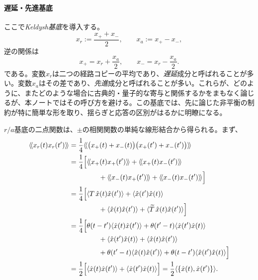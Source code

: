 \documentclass[a4paper,11pt,oneside]{article}
\theoremstyle{definition}
\numberwithin{equation}{section}
\begin{document}
\paragraph{遅延・先進基底} ここで\textit{Keldysh基底}を導入する。
\begin{equation}
x_r := \frac{x_+ + x_-}{2},
\qquad
x_a := x_+ - x_- ,
\end{equation}
逆の関係は
\begin{equation}
x_+ = x_r + \frac{x_a}{2},
\qquad
x_- = x_r - \frac{x_a}{2} .
\end{equation}
である。変数$x_r$は二つの経路コピーの平均であり、\textit{遅延}成分と呼ばれることが多い。変数$x_a$はその差であり、\textit{先進}成分と呼ばれることが多い。これらが、どのように、またどのような場合に古典的・量子的な寄与と関係するかをまもなく論じるが、本ノートではその呼び方を避ける。この基底では、先に論じた非平衡の制約が特に簡単な形を取り、揺らぎと応答の区別がはるかに明瞭になる。



$r/a$基底の二点関数は、$\pm$の相関関数の単純な線形結合から得られる。まず、
\begin{align}
\langle\!\langle x_r(t)x_r(t^{\prime})\rangle\!\rangle
&=
\frac{1}{4}
\langle\!\langle
\bigl(x_+(t)+x_-(t)\bigr)
\bigl(x_+(t^{\prime})+x_-(t^{\prime})\bigr)
\rangle\!\rangle
\nonumber\\
&=
\frac{1}{4}
\Bigl[
\langle\!\langle x_+(t)x_+(t^{\prime})\rangle\!\rangle
+
\langle\!\langle x_+(t)x_-(t^{\prime})\rangle\!\rangle
\nonumber\\
&\hspace{1.5cm}
+
\langle\!\langle x_-(t)x_+(t^{\prime})\rangle\!\rangle
+
\langle\!\langle x_-(t)x_-(t^{\prime})\rangle\!\rangle
\Bigr]
\nonumber\\
&=
\frac{1}{4}
\Bigl[
\langle  T\,\hat x(t)\hat x(t^{\prime})\rangle
+
\langle \hat x(t^{\prime})\hat x(t)\rangle
\nonumber\\
&\hspace{1.5cm}
+
\langle \hat x(t)\hat x(t^{\prime})\rangle
+
\langle \widetilde{ T}\,\hat x(t)\hat x(t^{\prime})\rangle
\Bigr]
\nonumber\\
&=
\frac{1}{4}
\Bigl[
\theta(t-t^{\prime})
\langle \hat x(t)\hat x(t^{\prime})\rangle
+
\theta(t^{\prime}-t)
\langle \hat x(t^{\prime})\hat x(t)\rangle
\nonumber\\
&\hspace{1.5cm}
+
\langle \hat x(t^{\prime})\hat x(t)\rangle
+
\langle \hat x(t)\hat x(t^{\prime})\rangle
\nonumber\\
&\hspace{1.5cm}
+
\theta(t^{\prime}-t)
\langle \hat x(t)\hat x(t^{\prime})\rangle
+
\theta(t-t^{\prime})
\langle \hat x(t^{\prime})\hat x(t)\rangle
\Bigr]
\nonumber\\
&=
\frac{1}{2}
\Bigl[
\langle \hat x(t)\hat x(t^{\prime})\rangle
+
\langle \hat x(t^{\prime})\hat x(t)\rangle
\Bigr]=
\frac{1}{2}
\langle
\{\hat x(t),\hat x(t^{\prime})\}
\rangle .
\end{align}
\end{document}
